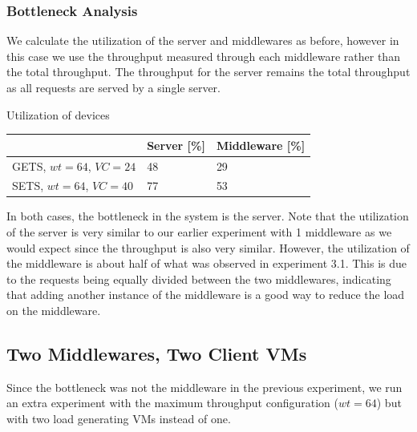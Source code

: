 \documentclass[11pt,a4paper]{article}
\begin{document}
\pagebreak

\subsubsection{Bottleneck Analysis}
We calculate the utilization of the server and middlewares as before, however in this case we use the throughput measured through each middleware rather than the total throughput. The throughput for the server remains the total throughput as all requests are served by a single server.

\begin{center}
	{Utilization of devices\\}
	\begin{tabular}{|l|p{3cm}|p{3cm}|}
		\hline        & Server  [\%]                 & Middleware [\%]                             \\ 
		\hline GETS,  $wt=64$, $VC=24$     &    48       &       29         \\ 
		\hline SETS,  $wt=64$, $VC=40$     &    77       &       53        \\ 
		\hline 
	\end{tabular}
\end{center}

In both cases, the bottleneck in the system is the server. Note that the utilization of the server is very similar to our earlier experiment with 1 middleware as we would expect since the throughput is also very similar. However, the utilization of the middleware is about half of what was observed in experiment 3.1. This is due to the requests being equally divided between the two middlewares, indicating that adding another instance of the middleware is a good way to reduce the load on the middleware.

\pagebreak
\subsection{Two Middlewares, Two Client VMs}
Since the bottleneck was not the middleware in the previous experiment, we run an extra experiment with the maximum throughput configuration ($wt=64$) but with two load generating VMs instead of one.
\end{document}
